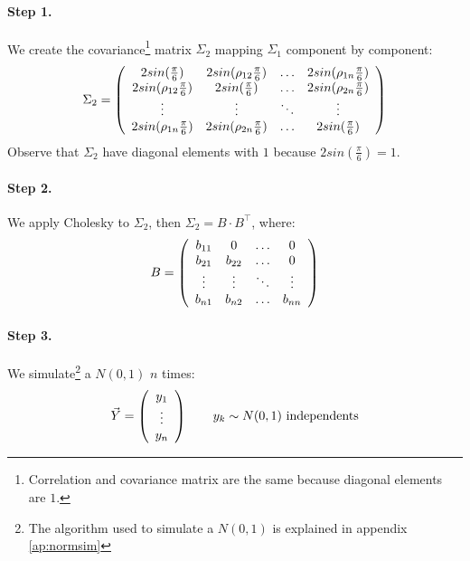 \documentclass[a4paper,12pt,final]{article}
\begin{document}
\paragraph{Step 1.} We create the covariance\footnote{Correlation and covariance 
matrix are the same because diagonal elements are $1$.} matrix $\Sigma_2$ mapping 
$\Sigma_1$ component by component:
\begin{displaymath}
\Sigma_2 = \left( 
\begin{array}{cccc}
2 sin(\frac{\pi}{6})           & 2 sin(\rho_{12} \frac{\pi}{6}) & \ldots & 2 sin(\rho_{1n} \frac{\pi}{6})\cr
2 sin(\rho_{12} \frac{\pi}{6}) & 2 sin(\frac{\pi}{6})           & \ldots & 2 sin(\rho_{2n} \frac{\pi}{6})\cr
\vdots                         & \vdots                         & \ddots  & \vdots   \cr
2 sin(\rho_{1n} \frac{\pi}{6}) & 2 sin(\rho_{2n} \frac{\pi}{6}) & \ldots & 2 sin(\frac{\pi}{6})
\end{array}
\right)
\end{displaymath}
Observe that $\Sigma_2$ have diagonal elements with $1$ because $2 sin(\frac{\pi}{6}) = 1$.

\paragraph{Step 2.} We apply Cholesky to $\Sigma_2$, then $\Sigma_2 = B \cdot B^{\top}$, 
where:
\begin{displaymath}
B = 
\left(
\begin{array}{cccc}
b_{11}   & 0        & \ldots & 0       \cr
b_{21}   & b_{22}   & \ldots & 0       \cr
\vdots  & \vdots  & \ddots & \vdots \cr
b_{n1}   & b_{n2}   & \ldots & b_{nn}
\end{array}
\right)
\end{displaymath}

\paragraph{Step 3.} We simulate\footnote{The algorithm used to simulate a $N(0,1)$
is explained in appendix \ref{ap:normsim}} a $N(0,1)$ $n$ times:
\begin{displaymath}
\vec{Y} =
\left(
\begin{array}{c}
y_1 \cr
\vdots \cr
y_n
\end{array}
\right) 
\qquad y_k \sim N(0,1) \textrm{ independents}
\end{displaymath}
\end{document}
